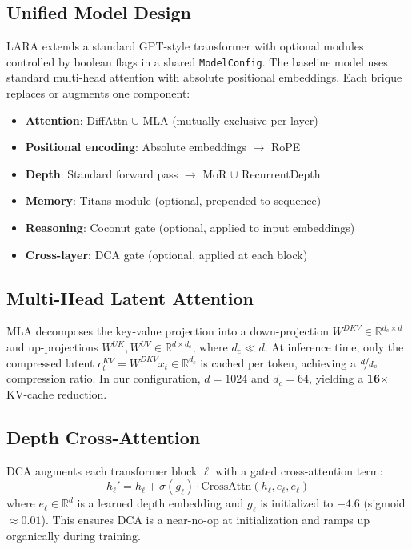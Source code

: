 \documentclass{article}
\begin{document}
\subsection{Unified Model Design}

LARA extends a standard GPT-style transformer \citep{radford2019language} with optional modules controlled by boolean flags in a shared \texttt{ModelConfig}. The baseline model uses standard multi-head attention with absolute positional embeddings. Each brique replaces or augments one component:

\begin{itemize}
  \item \textbf{Attention}: DiffAttn $\cup$ MLA (mutually exclusive per layer)
  \item \textbf{Positional encoding}: Absolute embeddings $\to$ RoPE
  \item \textbf{Depth}: Standard forward pass $\to$ MoR $\cup$ RecurrentDepth
  \item \textbf{Memory}: Titans module (optional, prepended to sequence)
  \item \textbf{Reasoning}: Coconut gate (optional, applied to input embeddings)
  \item \textbf{Cross-layer}: DCA gate (optional, applied at each block)
\end{itemize}

\subsection{Multi-Head Latent Attention}

MLA decomposes the key-value projection into a down-projection $W^{DKV} \in \mathbb{R}^{d_c \times d}$ and up-projections $W^{UK}, W^{UV} \in \mathbb{R}^{d \times d_c}$, where $d_c \ll d$. At inference time, only the compressed latent $c_t^{KV} = W^{DKV} x_t \in \mathbb{R}^{d_c}$ is cached per token, achieving a $\nicefrac{d}{d_c}$ compression ratio. In our configuration, $d = 1024$ and $d_c = 64$, yielding a \textbf{16$\times$} KV-cache reduction.

\subsection{Depth Cross-Attention}

DCA augments each transformer block $\ell$ with a gated cross-attention term:
\[
  h_\ell' = h_\ell + \sigma(g_\ell) \cdot \text{CrossAttn}(h_\ell, e_\ell, e_\ell)
\]
where $e_\ell \in \mathbb{R}^d$ is a learned depth embedding and $g_\ell$ is initialized to $-4.6$ (sigmoid $\approx 0.01$). This ensures DCA is a near-no-op at initialization and ramps up organically during training.
\end{document}
